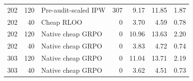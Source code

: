 \begin{tabular}{rrlrrrr}
202 & 120 & Pre-audit-scaled IPW & 307 & 9.17 & 11.85 & 1.87 \\
202 & 40 & Cheap RLOO & 0 & 3.70 & 4.59 & 0.78 \\
202 & 120 & Native cheap GRPO & 0 & 10.96 & 13.63 & 2.20 \\
202 & 40 & Native cheap GRPO & 0 & 3.83 & 4.72 & 0.74 \\
303 & 120 & Native cheap GRPO & 0 & 11.04 & 13.71 & 2.19 \\
303 & 40 & Native cheap GRPO & 0 & 3.62 & 4.51 & 0.73 \\
\bottomrule
\end{tabular}
